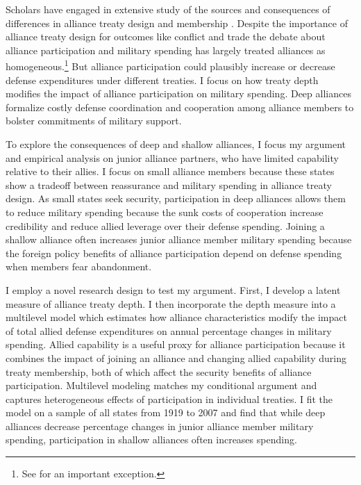 \documentclass[12pt]{article}
\begin{document}
Scholars have engaged in extensive study of the sources and consequences of differences in alliance treaty design and membership \citep{Mattes2012, Benson2012, Poast2019a, Morrow1991, Leeds2003, LeedsAnac2005, Fordham2010, Mattes2012,  Poast2013, Johnsonetal2015}. 
Despite the importance of alliance treaty design for outcomes like conflict \citep{Leeds2003, Benson2012} and trade \citep{LongLeeds2006} the debate about alliance participation and military spending has largely treated alliances as homogeneous.\footnote{See \citet{DigiuseppePoast2018} for an important exception.}
But alliance participation could plausibly increase or decrease defense expenditures under different treaties. 
I focus on how treaty depth modifies the impact of alliance participation on military spending. 
Deep alliances formalize costly defense coordination and cooperation among alliance members to bolster commitments of military support. 


To explore the consequences of deep and shallow alliances, I focus my argument and empirical analysis on junior alliance partners, who have limited capability relative to their allies. 
I focus on small alliance members because these states show a tradeoff between reassurance and military spending in alliance treaty design.
As small states seek security, participation in deep alliances allows them to reduce military spending because the sunk costs of cooperation increase credibility and reduce allied leverage over their defense spending. 
Joining a shallow alliance often increases junior alliance member military spending because the foreign policy benefits of alliance participation depend on defense spending when members fear abandonment.

 
I employ a novel research design to test my argument.
First, I develop a latent measure of alliance treaty depth. 
I then incorporate the depth measure into a multilevel model which estimates how alliance characteristics modify the impact of total allied defense expenditures on annual percentage changes in military spending.
Allied capability is a useful proxy for alliance participation because it combines the impact of joining an alliance and changing allied capability during treaty membership, both of which affect the security benefits of alliance participation. 
Multilevel modeling matches my conditional argument and captures heterogeneous effects of participation in individual treaties. 
I fit the model on a sample of all states from 1919 to 2007 and find that while deep alliances decrease percentage changes in junior alliance member military spending, participation in shallow alliances often increases spending.
\end{document}
